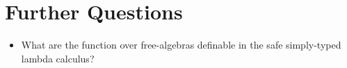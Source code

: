 \section{Further Questions}

\begin{itemize}
\item What are the function over free-algebras definable in the
safe simply-typed lambda calculus?
\cite{DBLP:journals/tcs/Leivant93,DBLP:journals/apal/Zaionc91}
  

\end{itemize}
